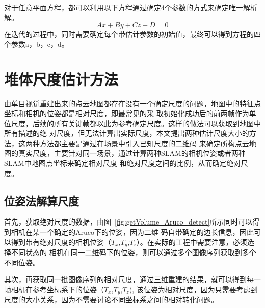 对于任意平面方程，都可以利用以下方程通过确定4个参数的方式来确定唯一解析解。
\begin{equation}Ax+By+Cz+D= 0\label{equ:plane}\end{equation}
在迭代的过程中，同时需要确定每个带估计参数的初始值，最终可以得到方程的四个参数a，b，c，d。

\section{堆体尺度估计方法}
\label{sec:4.3}
由单目视觉重建出来的点云地图都存在没有一个确定尺度的问题，地图中的特征点坐标和相机的位姿都是相对尺度，即最常见的采
取初始化成功后的前两帧作为单位尺度，后续的所有关键帧都以此为参考确定尺度。这样的做法可以获取到地图中所有描述的绝
对尺度，但无法计算出实际尺度，本文提出两种估计尺度大小的方法，这两种方法都主要是通过在场景中引入已知尺度的二维码
来确定所构点云地图的真实尺度，主要针对同一场景，通过计算两种SLAM的相机位姿或者两种SLAM中地图点坐标来确定相对尺度
和绝对尺度之间的比例，从而确定绝对尺度。
\subsection{位姿法解算尺度}
首先，获取绝对尺度的数据，由图~\ref{fig:getVolume_Aruco_detect}所示同时可以得到相机在某一个确定的Aruco下的位姿，因为二维
码自带确定的边长信息，因此可以得到带有绝对尺度的相机位姿（$T_x$,$T_y$,$T_z$）。在实际的工程中需要注意，必须选择不同状态的
相机在同一二维码下的位姿，则可以通过多个图像序列获取到多个不同位姿。

其次，再获取同一批图像序列的相对尺度，通过三维重建的结果，就可以得到每一帧相机在参考坐标系下的位姿（$T_x$,$T_y$,$T_z$),
该位姿为相对尺度，因为只需要考虑到尺度的大小关系，因为不需要讨论不同坐标系之间的相对转化问题。

